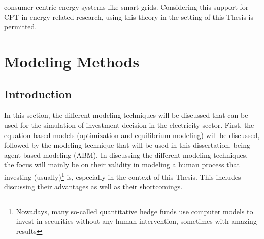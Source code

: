 consumer-centric energy systems like smart grids. Considering this support for CPT in energy-related research, using this theory in the setting of this Thesis is permitted. 
\section{{Modeling Methods}} \label{Modeling}
\subsection{\large{Introduction}}
In this section, the different modeling techniques will be discussed that can be used for the simulation of investment decision in the electricity sector. First, the equation based models (optimization and equilibrium modeling) will be discussed, followed by the modeling technique that will be used in this dissertation, being agent-based modeling (ABM). In discussing the different modeling techniques, the focus will mainly be on their validity in modeling a human process that investing (usually)\footnote{Nowadays, many so-called quantitative hedge funds use computer models to invest in securities without any human intervention, sometimes with amazing results} is, especially in the context of this Thesis. This includes discussing their advantages as well as their shortcomings. 
